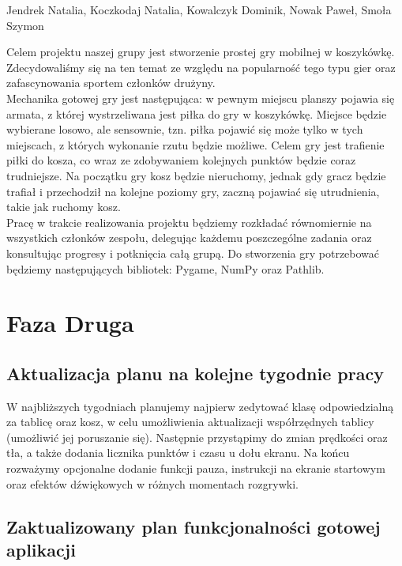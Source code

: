 \documentclass{article}
\begin{document}
\begin{center}
\large Jendrek Natalia, Koczkodaj Natalia, Kowalczyk Dominik, Nowak Paweł, Smoła Szymon \\
\end{center}

\bigskip

\large Celem projektu naszej grupy jest stworzenie prostej gry mobilnej w koszykówkę. Zdecydowaliśmy się na ten temat ze względu na popularność tego typu gier oraz zafascynowania sportem członków drużyny.\\

\smallskip
Mechanika gotowej gry jest następująca: w pewnym miejscu planszy pojawia się armata, z której wystrzeliwana jest piłka do gry w koszykówkę. Miejsce będzie wybierane losowo, ale sensownie, tzn. piłka pojawić się może tylko w tych miejscach, z których wykonanie rzutu będzie możliwe. Celem gry jest trafienie piłki do kosza, co wraz ze zdobywaniem kolejnych punktów będzie coraz trudniejsze. Na początku gry kosz będzie nieruchomy, jednak gdy gracz będzie trafiał i przechodził na kolejne poziomy gry, zaczną pojawiać się utrudnienia, takie jak ruchomy kosz.\\

\smallskip
\large Pracę w trakcie realizowania projektu będziemy rozkładać równomiernie na wszystkich członków zespołu, delegując każdemu poszczególne zadania oraz konsultując progresy i potknięcia całą grupą. Do stworzenia gry potrzebować będziemy następujących bibliotek: Pygame, NumPy oraz Pathlib. \\


\section{Faza Druga}
\subsection{Aktualizacja planu na kolejne tygodnie pracy}

\smallskip
\large W najbliższych tygodniach planujemy najpierw zedytować klasę odpowiedzialną za tablicę oraz kosz, w celu umożliwienia aktualizacji współrzędnych tablicy (umożliwić jej poruszanie się). Następnie przystąpimy do zmian prędkości oraz tła, a także dodania licznika punktów i czasu u dołu ekranu. Na końcu rozważymy opcjonalne dodanie funkcji pauza, instrukcji na ekranie startowym oraz efektów dźwiękowych w różnych momentach rozgrywki.

\subsection{Zaktualizowany plan funkcjonalności gotowej aplikacji}
\end{document}
